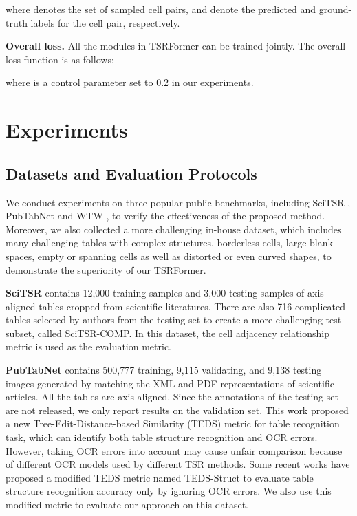\documentclass[sigconf]{acmart}
\begin{document}
\noindent where  denotes the set of sampled cell pairs,
 and  denote the predicted and ground-truth labels for the  cell pair, respectively.


\textbf{Overall loss.} All the modules in TSRFormer can be trained jointly. The overall loss function is as follows:
\begin{small}

\end{small}

\noindent where  is a control parameter set to 0.2 in our experiments.

\section{Experiments}
\subsection{Datasets and Evaluation Protocols}
 We conduct experiments on three popular public benchmarks, including SciTSR \cite{chi2019complicated}, PubTabNet \cite{zhong2020image} and WTW \cite{long2021parsing}, to verify the effectiveness of the proposed method. Moreover, we also collected a more challenging in-house dataset, which includes many challenging tables with complex structures, borderless cells, large blank spaces, empty or spanning cells as well as distorted or even curved shapes, to demonstrate the superiority of our TSRFormer.

\textbf{SciTSR} \cite{chi2019complicated} contains 12,000 training samples and 3,000 testing samples of axis-aligned tables cropped from scientific literatures. There are also 716 complicated tables selected by authors from the testing set to create a more challenging test subset, called SciTSR-COMP. In this dataset, the cell adjacency relationship metric \cite{gobel2013icdar} is used as the evaluation metric.

\textbf{PubTabNet} \cite{zhong2020image} contains 500,777 training, 9,115 validating, and 9,138 testing images generated by matching the XML and PDF representations of scientific articles. All the tables are axis-aligned. Since the annotations of the testing set are not released, we only report results on the validation set. This work proposed a new Tree-Edit-Distance-based Similarity (TEDS) metric for table recognition task, which can identify both table structure recognition and OCR errors. However, taking OCR errors into account may cause unfair comparison because of different OCR models used by different TSR methods. Some recent works \cite{GTE2021,TabStruct2020,Qiao2021LGPMACT} have proposed a modified TEDS metric named TEDS-Struct to evaluate table structure recognition accuracy only by ignoring OCR errors. We also use this modified metric to evaluate our approach on this dataset.
\end{document}
